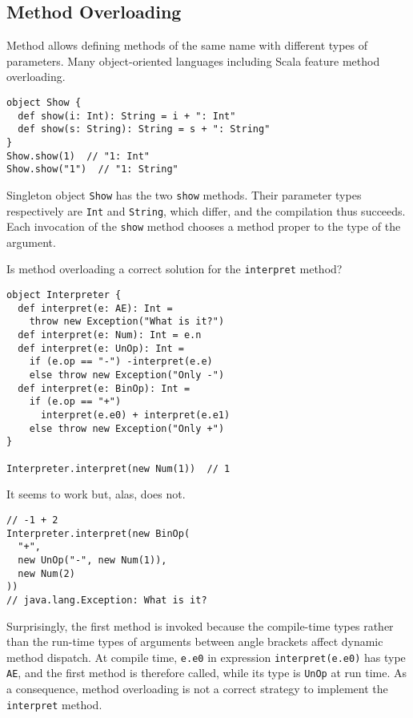 \subsection{Method Overloading}

Method  allows defining methods of the same name with different
types of parameters. Many object-oriented languages including Scala feature
method overloading.

\begin{verbatim}
object Show {
  def show(i: Int): String = i + ": Int"
  def show(s: String): String = s + ": String"
}
Show.show(1)  // "1: Int"
Show.show("1")  // "1: String"
\end{verbatim}

Singleton object \verb!Show! has the two \verb!show! methods. Their parameter
types respectively are \verb!Int! and \verb!String!, which differ, and the
compilation thus succeeds. Each invocation of the \verb!show! method chooses a
method proper to the type of the argument.

Is method overloading a correct solution for the \verb!interpret! method?

\begin{verbatim}
object Interpreter {
  def interpret(e: AE): Int =
    throw new Exception("What is it?")
  def interpret(e: Num): Int = e.n
  def interpret(e: UnOp): Int =
    if (e.op == "-") -interpret(e.e)
    else throw new Exception("Only -")
  def interpret(e: BinOp): Int =
    if (e.op == "+")
      interpret(e.e0) + interpret(e.e1)
    else throw new Exception("Only +")
}

Interpreter.interpret(new Num(1))  // 1
\end{verbatim}

It seems to work but, alas, does not.

\begin{verbatim}
// -1 + 2
Interpreter.interpret(new BinOp(
  "+",
  new UnOp("-", new Num(1)),
  new Num(2)
))
// java.lang.Exception: What is it?
\end{verbatim}

Surprisingly, the first method is invoked because the compile-time types rather
than the run-time types of arguments between angle brackets affect dynamic method
dispatch. At compile time, \verb!e.e0! in expression \verb!interpret(e.e0)! has
type \verb!AE!, and the first method is therefore called, while its type is
\verb!UnOp! at run time. As a consequence, method overloading is not a correct
strategy to implement the \verb!interpret! method.


